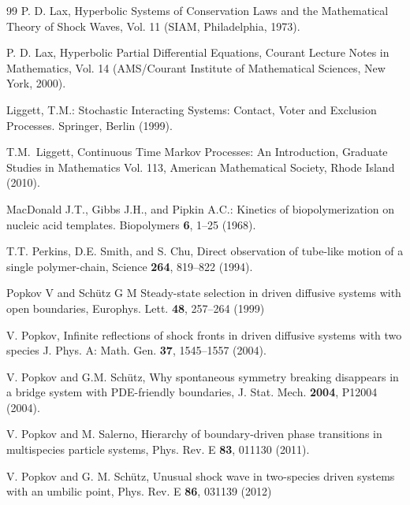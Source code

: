 \documentclass[12pt]{article}
\begin{document}
\begin{thebibliography}{99}
P. D. Lax, Hyperbolic Systems of Conservation Laws and
the Mathematical Theory of Shock Waves, Vol. 11 (SIAM,
Philadelphia, 1973).

P. D. Lax, Hyperbolic Partial Differential Equations, Courant
Lecture Notes in Mathematics, Vol. 14 (AMS/Courant Institute
of Mathematical Sciences, New York, 2000).


Liggett, T.M.:
Stochastic Interacting Systems: Contact, Voter and Exclusion Processes.
Springer, Berlin (1999).

T.M.~Liggett, 
Continuous Time Markov Processes: An Introduction,
Graduate Studies in Mathematics Vol. 113,
American Mathematical Society, Rhode Island (2010).

MacDonald J.T., Gibbs J.H., and Pipkin A.C.:
Kinetics of biopolymerization on nucleic acid templates.
Biopolymers \textbf{6}, 1--25 (1968).


  T.T. Perkins, D.E. Smith, and S. Chu, Direct observation of tube-like motion of a single polymer-chain, Science {\bf 264}, 819--822 (1994).

Popkov V and Sch\"utz G M 
Steady-state selection in driven diffusive systems with open 
boundaries,
Europhys. Lett. \textbf{48}, 257--264 (1999)

V. Popkov,
Infinite reflections of shock fronts in driven diffusive systems with two species
J. Phys. A: Math. Gen. \textbf{37}, 1545--1557 (2004).

V. Popkov and G.M. Sch\"utz,
Why spontaneous symmetry breaking disappears in a bridge system with PDE-friendly boundaries,
 J. Stat. Mech. \textbf{2004}, P12004 (2004).

V. Popkov and M. Salerno, 
Hierarchy of boundary-driven phase transitions in multispecies particle systems,
Phys. Rev. E \textbf{83}, 011130 (2011).

V. Popkov and G. M. Schütz,
Unusual shock wave in two-species driven systems with an umbilic point,
Phys. Rev. E \textbf{86}, 031139 (2012)


\end{thebibliography}
\end{document}
